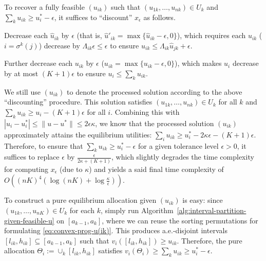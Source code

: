 To recover a fully feasible $(u_{ik})$ such that $(u_{1k}, \dots, u_{nk}) \in U_k$ and $\sum_k u_{ik} \geq u^*_i - \epsilon$, it suffices to ``discount'' $x_\epsilon$ as follows.
\begin{enumerate*}[(i)]
	\item Decrease each $\hat{u}_{ik}$ by $\epsilon$ (that is, $\hat{u}'_{ik} = \max\{ \hat{u}_{ik}-\epsilon,0 \}$), which requires each $u_{ik}$ ($i=\sigma^k(j)$) decrease by $\Lambda_{ik} \epsilon\leq \epsilon$ to ensure $u_{ik} \leq \Lambda_{ik} \hat{u}_{jk} + \epsilon$.
	\item Further decrease each $u_{ik}$ by $\epsilon$ ($u_{ik} = \max\{ u_{ik} - \epsilon, 0 \}$), which makes $u_i$ decrease by at most $(K+1) \epsilon$ to ensure $ u_i \leq \sum_k u_{ik}$.
\end{enumerate*}
We still use $(u_{ik})$ to denote the processed solution according to the above ``discounting'' procedure. This solution satisfies $(u_{1k}, \dots, u_{nk})\in U_k$ for all $k$ and $\sum_k u_{ik} \geq u_i - (K+1)\epsilon$ for all $i$. Combining this with $|u_i - u^*_i| \leq \|u-u^*\| \leq 2\epsilon \kappa$, we know that the processed solution $(u_{ik})$ approximately attains the equilibrium utilities:
$\sum_i u_{ik} \geq u^*_i - 2\kappa \epsilon - (K+1)\epsilon$.
Therefore, to ensure that $\sum_k u_{ik} \geq u^*_i - \epsilon$ for a given tolerance level $\epsilon>0$, it suffices to replace $\epsilon$ by $\frac{\epsilon}{2\kappa+ (K+1)}$, which slightly degrades the time complexity for computing $x_\epsilon$ (due to $\kappa$) and yields a said final time complexity of 
$O\left( (nK)^4 \left(\log (nK) + \log \frac{\kappa}{\epsilon}  \right) \right)$.

To construct a pure equilibrium allocation given $(u_{ik})$ is easy: since $(u_{1k}, \dots, u_{nK})\in U_k$ for each $k$, simply run Algorithm~\ref{alg:interval-partition-given-feasible-u} on $[a_{k-1}, a_k]$, where we can reuse the sorting permutations for formulating \eqref{eq:convex-prog-u(ik)}. This produces a.e.-disjoint intervals $[l_{ik}, h_{ik}]\subseteq [a_{k-1}, a_k]$ such that $v_i([l_{ik}, h_{ik}]) \geq u_{ik}$. Therefore, the pure allocation $\Theta_i := \cup_k [l_{ik}, h_{ik}]$ satisfies
$v_i(\Theta_i) \geq \sum_k u_{ik} \geq u^*_i - \epsilon$. 
